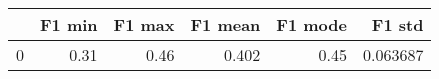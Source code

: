 \begin{tabular}{lrrrrr}
\toprule
{} &  F1 min &  F1 max &  F1 mean &  F1 mode &    F1 std \\
\midrule
0 &    0.31 &    0.46 &    0.402 &     0.45 &  0.063687 \\
\bottomrule
\end{tabular}
